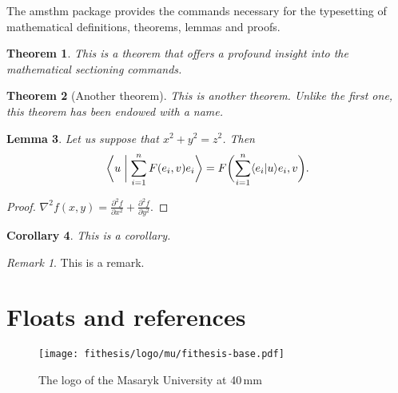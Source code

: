 \documentclass[
  digital, %
  table,   %
  nolof,     %
  nolot,     %
]{fithesis3}
\begin{document}
The \textsf{amsthm} package provides the commands necessary for the
typesetting of mathematical definitions, theorems, lemmas and
proofs.

\newtheorem{theorem}{Theorem}[section] %
\newtheorem{lemma}[theorem]{Lemma}         %
\newtheorem{corollary}[theorem]{Corollary} %
\theoremstyle{definition}
\newtheorem{definition}{Definition}
\theoremstyle{remark}
\newtheorem*{remark}{Remark}

\begin{theorem}
  This is a theorem that offers a profound insight into the
  mathematical sectioning commands.
\end{theorem}
\begin{theorem}[Another theorem]
  This is another theorem. Unlike the first one, this theorem has
  been endowed with a name.
\end{theorem}
\begin{lemma}
  Let us suppose that $x^2+y^2=z^2$. Then
  \begin{equation}
    \biggl\langle u\biggm|\sum_{i=1}^nF(e_i,v)e_i\biggr\rangle
    =F\biggl(\sum_{i=1}^n\langle e_i|u\rangle e_i,v\biggr).
  \end{equation}
\end{lemma}
\begin{proof}
  $\nabla^2 f(x,y)=\frac{\partial^2f}{\partial x^2}+
   \frac{\partial^2f}{\partial y^2}$.
\end{proof}
\begin{corollary}
  This is a corollary.
\end{corollary}
\begin{remark}
  This is a remark.
\end{remark}

\chapter{Floats and references}
\begin{figure}
  \begin{center}
    \texttt{[image: fithesis/logo/mu/fithesis-base.pdf]}
  \end{center}
  \caption{The logo of the Masaryk University at 40\,mm}
  \label{fig:mulogo1}
\end{figure}
\end{document}
